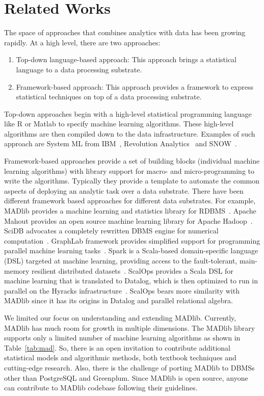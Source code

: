 \section{Related Works}
\label{sec:relwork}
The space of approaches that combines analytics with data has been growing rapidly. At a high level, there are two approaches:
\begin{enumerate}
\item Top-down language-based approach: This approach brings a statistical language to a data processing substrate.
\item Framework-based approach: This approach provides a framework to express statistical techniques on top of a data processing substrate. 
\end{enumerate}
  
Top-down approaches begin with a high-level statistical programming language like R or Matlab to specify machine learning algorithms. These high-level algorithms are then compiled down to the data infrastructure. Examples of such approach are System ML from IBM~\cite{systemml11}, Revolution Analytics~\cite{rev} and SNOW~\cite{snow09}.

Framework-based approaches provide a set of building blocks (individual machine learning algorithms) with library support for macro- and micro-programming to write the algorithms. Typically they provide a template to automate the common aspects of deploying an analytic task over a data substrate. There have been different framework based approaches for different data substrates. For example, MADlib provides a machine learning and statistics library for RDBMS~\cite{madlib12}. Apache Mahout provides an open source machine learning library for Apache Hadoop~\cite{mahout}. SciDB advocates a completely rewritten DBMS engine for numerical computation~\cite{scidb11}. GraphLab framework provides simplified support for programming parallel machine learning tasks~\cite{graph12}. Spark is a Scala-based domain-specific language (DSL) targeted at machine learning, providing access to the fault-tolerant, main-memory resilient distributed datasets~\cite{resi12}. ScalOps provides a Scala DSL for machine learning that is translated to Datalog, which is then optimized to run in parallel on the Hyracks infrastructure~\cite{hyracks11}. ScalOps bears more similarity with MADlib since it has its origins in Datalog and parallel relational algebra.

We limited our focus on understanding and extending MADlib. Currently, MADlib has much room for growth in multiple dimensions. The MADlib library supports only a limited number of machine learning algorithms as shown in Table~\ref{tab:mad}. So, there is an open invitation to contribute additional statistical models and algorithmic methods, both textbook techniques and cutting-edge research. Also, there is the challenge of porting MADlib to DBMSs other than PostgreSQL and Greenplum. Since MADlib is open source, anyone can contribute to MADlib codebase following their guidelines. 
